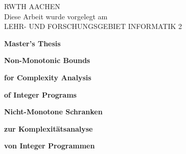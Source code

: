 \thispagestyle{empty}

\begin{center}
  
  \vspace*{-20mm}
  
  \iffalse\texttt{[image: Bilder/ADA\_Logo.jpg]}\fi
  
  \vspace*{1cm}
  
  {\Large RWTH AACHEN\\[5mm]}
  Diese Arbeit wurde vorgelegt am \\
  LEHR- UND FORSCHUNGSGEBIET INFORMATIK 2\\
  
  \vspace*{3cm}
  
  {\Large \textbf{Master's Thesis}}\\ 
  
  \vspace{1cm}

  {\Large \textbf{Non-Monotonic Bounds}}\\ 

  \vspace*{1mm}

  {\Large \textbf{for Complexity Analysis}}\\ 

  \vspace*{1mm}

  {\Large \textbf{of Integer Programs}}\\

  \vspace{1.5cm}
  
  {\Large \textbf{Nicht-Monotone Schranken}}\\ 

  \vspace*{1mm}

  {\Large \textbf{zur Komplexitätsanalyse}}\\ 

  \vspace*{1mm}

  {\Large \textbf{von Integer Programmen}}\\
  
  \vspace{1.5cm}
  

\end{center}
